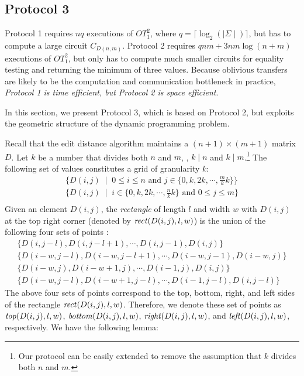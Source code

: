 \subsection{Protocol 3}
\label{subsec:protocol3}

Protocol 1 requires $nq$ executions of $OT_1^2$, where $q = \lceil
\log_2 ( \mid \Sigma \mid ) \rceil$, but has to compute a large circuit
$C_{D(n,m)}$.  Protocol 2 requires $qnm + 3nm\log(n+m)$ executions of
$OT_1^2$, but only has to compute much smaller circuits for equality
testing and returning the minimum of three values.  Because oblivious
transfers are likely to be the computation and communication bottleneck
in practice, \emph{Protocol 1 is time efficient, but Protocol 2 is
space efficient}.

In this section, we present Protocol 3, which is based on Protocol 2,
but exploits the geometric structure of the dynamic programming problem.

Recall that the edit distance algorithm maintains a $(n+1) \times (m+1)$
matrix $D$. Let $k$ be a number that divides both $n$ and $m$, \ie, $k
\mid n$ and $k \mid m$.\footnote{Our protocol can be easily extended to
remove the assumption that $k$ divides both $n$ and $m$.} The following
set of values constitutes a grid of granularity $k$:
\[
\begin{array}{l}
\{ D (i,j) \; \mid \; \mbox{$0 \leq i \leq n$ and $j \in \{ 0, k, 2k , \cdots, \frac{m}{k} k \}$} \} \\
\{ D (i,j) \; \mid \; \mbox{$i \in \{ 0, k, 2k , \cdots, \frac{n}{k} k \}$ and $0 \leq j \leq m$} \} \\
\end{array}
\]
Given an element $D(i,j)$, the {\it rectangle} of length $l$ and width
$w$ with $D(i,j)$ at the top right corner (denoted by ${\it
rect}(D(i,j),l,w)$) is the union of the following four sets of points
:
\[
\begin{array}{l}
\{ D(i,j-l),D(i,j-l+1),\cdots,D(i,j-1), D(i,j) \} \\
\{ D(i-w,j-l),D(i-w,j-l+1),\cdots,D(i-w,j-1), D(i-w,j) \} \\
\{ D(i-w,j),D(i-w+1,j),\cdots,D(i-1,j), D(i,j) \}  \\
\{ D(i-w,j-l),D(i-w+1,j-l),\cdots,D(i-1,j-l), D(i,j-l) \} 
\end{array}
\]
The above four sets of points correspond to the top, bottom, right, and left
sides of the rectangle  ${\it rect}(D(i,j),l,w)$. Therefore, we denote these set of
points as ${\it top}(D(i,j),l,w)$, ${\it bottom}(D(i,j),l,w)$, ${\it right}(D(i,j),l,w)$, 
and ${\it left}(D(i,j),l,w)$, respectively. We have the following lemma:

